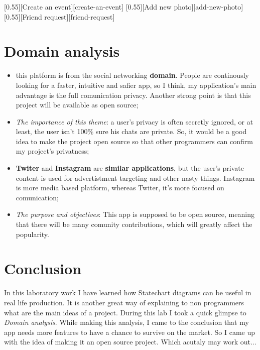 \documentclass{article}
\begin{document}
		[Create an event][create-an-event]
		[Add new photo][add-new-photo]
		[Friend request][friend-request]

	\section{Domain analysis}
		\begin{itemize}
			\item this platform is from the social networking \textbf{domain}. People are continously looking for a faster, intuitive and safier app, so I think, my application's main advantage is the full comunication privacy. Another strong point is that this project will be available as open source;
			
			\item \textit{The importance of this theme}: a user's privacy is often secretly ignored, or at least, the user isn't 100\% sure his chats are private. So, it would be a good idea to make the project open source so that other programmers can confirm my project's privatness;
			
			\item \textbf{Twiter} and \textbf{Instagram} are \textbf{similar applications}, but the user's private content is used for advertistment targeting and other nasty things. Instagram is more media based platform, whereas Twiter, it's more focused on comunication;
			
			\item \textit{The purpose and objectives}: This app is supposed to be open source, meaning that there will be many comunity contributions, which will greatly affect the popularity.
		\end{itemize}

	\section{Conclusion}
		In this laboratory work I have learned how Statechart diagrams can be useful in real life production. It is another great way of explaining to non programmers what are the main ideas of a project.
		During this lab I took a quick glimpse to \textit{Domain analysis}. While making this analysis, I came to the conclusion that my app needs more features to have a chance to survive on the market. So I came up with the idea of making it an open source project. Which acutaly may work out...
\end{document}
